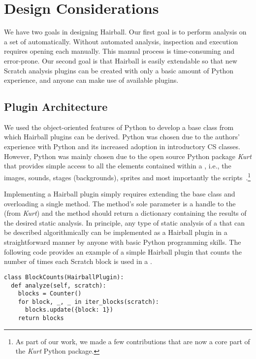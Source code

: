 \section{Design Considerations}

We have two goals in designing Hairball. Our first goal is to perform analysis
on a set of  automatically. Without automated analysis, inspection
and execution requires opening each \sprogram{} manually. This manual process
is time-consuming and error-prone.  Our second goal is that Hairball is easily
extendable so that new Scratch analysis plugins can be created with only a
basic amount of Python experience, and anyone can make use of available
plugins.


\subsection*{Plugin Architecture}
We used the object-oriented features of Python to develop a base class from
which Hairball plugins can be derived. Python was chosen due to the authors'
experience with Python and its increased adoption in introductory CS
classes. However, Python was mainly chosen due to the open source Python
package \emph{Kurt} that provides simple access to all the elements contained
within a \sprogram{}, i.e., the images, sounds, stages (backgrounds), sprites
and most importantly the scripts~\cite{Radvan:2012:Online}.\footnote{As part of
  our work, we made a few contributions that are now a core part of the
  \emph{Kurt} Python package.}

Implementing a Hairball plugin simply requires extending the base class and
overloading a single method. The method's sole parameter is a handle to the
\sprogram{} (from \emph{Kurt}) and the method should return a dictionary
containing the results of the desired static analysis. In principle, any type
of static analysis of a \sprogram{} that can be described algorithmically can
be implemented as a Hairball plugin in a straightforward manner by anyone with
basic Python programming skills. The following code provides an example of a
simple Hairball plugin that counts the number of times each Scratch block is
used in a \sprogram{}.

\begin{verbatim}
class BlockCounts(HairballPlugin):
  def analyze(self, scratch):
    blocks = Counter()
    for block, _, _ in iter_blocks(scratch):
      blocks.update({block: 1})
    return blocks
\end{verbatim}

